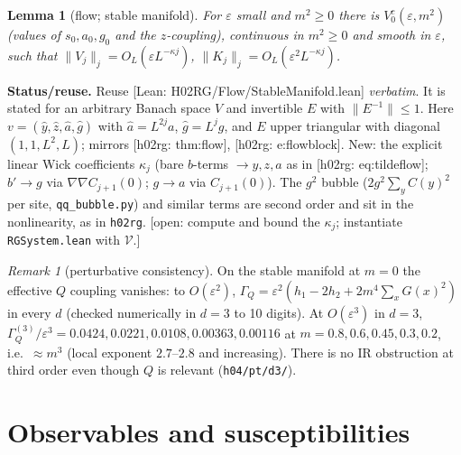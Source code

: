 \documentclass[11pt]{article}
\newtheorem{lemma}[theorem]{Lemma}
\theoremstyle{definition}
\theoremstyle{remark}
\newtheorem{remark}[theorem]{Remark}
\newcommand{\eps}{\varepsilon}
\newcommand{\status}[1]{\par\smallskip\noindent\textbf{Status/reuse.} #1\par\smallskip}
\newcommand{\reuse}[1]{\textsf{[h02rg: #1]}}
\newcommand{\lean}[1]{\textsf{[Lean: #1]}}
\newcommand{\open}[1]{\textcolor{red!60!black}{\textsf{[open: #1]}}}
\begin{document}
\begin{lemma}[flow; stable manifold]\label{lem:flow}
  For $\eps$ small and $m^2\ge0$ there is $V_0^c(\eps,m^2)$ (values of $s_0,a_0,g_0$ and the
  $z$-coupling), continuous in $m^2\ge0$ and smooth in $\eps$, such that
  $\|V_j\|_j=O_L(\eps L^{-\kappa j})$, $\|K_j\|_j=O_L(\eps^2L^{-\kappa j})$.
\end{lemma}
\status{Reuse \lean{H02RG/Flow/StableManifold.lean} \emph{verbatim}. It is stated for an
arbitrary Banach space $V$ and invertible $E$ with $\|E^{-1}\|\le1$. Here
$v=(\hat y,\hat z,\hat a,\hat g)$ with $\hat a=L^{2j}a$, $\hat g=L^{j}g$, and
$E$ upper triangular with diagonal $(1,1,L^2,L)$; mirrors \reuse{thm:flow}, \reuse{e:flowblock}.
New: the explicit linear Wick coefficients $\kappa_j$ (bare $b$-terms $\to y,z,a$ as in
\reuse{eq:tildeflow}; $b'\to g$ via $\nabla\nabla C_{j+1}(0)$; $g\to a$ via $C_{j+1}(0)$). The
$g^2$ bubble ($2g^2\sum_yC(y)^2$ per site, \texttt{qq\_bubble.py}) and similar terms are
second order and sit in the nonlinearity, as in \texttt{h02rg}. \open{compute and bound the
$\kappa_j$; instantiate \texttt{RGSystem.lean} with $\mathcal V$.}}

\begin{remark}[perturbative consistency]
  On the stable manifold at $m=0$ the effective $Q$ coupling vanishes: to $O(\eps^2)$,
  $\Gamma_Q=\eps^2(h_1-2h_2+2m^4\sum_xG(x)^2)$ in every $d$ (checked numerically in $d=3$ to
  10 digits). At $O(\eps^3)$ in $d=3$, $\Gamma_Q^{(3)}/\eps^3=0.0424,0.0221,0.0108,0.00363,0.00116$
  at $m=0.8,0.6,0.45,0.3,0.2$, i.e.\ $\approx m^{3}$ (local exponent $2.7$--$2.8$ and increasing).
  There is no IR obstruction at third order even though $Q$ is relevant
  (\texttt{h04/pt/d3/}).
\end{remark}

\section{Observables and susceptibilities}
\end{document}
